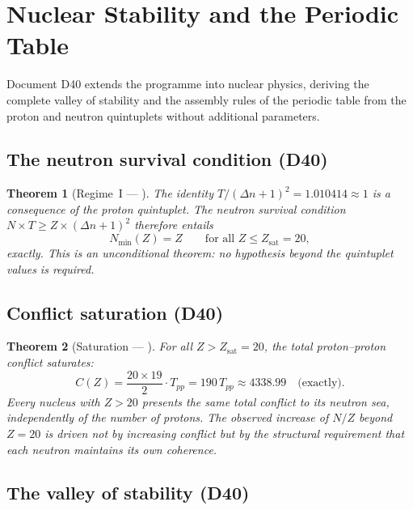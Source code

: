 \documentclass[11pt,a4paper]{article}
\theoremstyle{plain}
\newtheorem{theorem}{Theorem}[section]
\theoremstyle{definition}
\theoremstyle{remark}
\newcommand{\Tpp}{T_{pp}}
\newcommand{\Zsat}{Z_{\mathrm{sat}}}
\newcommand{\Nmin}{N_{\min}}
\begin{document}
\section{Nuclear Stability and the Periodic Table}
\label{sec:nuclear}

Document D40 extends the programme into nuclear physics, deriving the complete valley of stability and the assembly rules of the periodic table from the proton and neutron quintuplets without additional parameters.

\subsection{The neutron survival condition (D40)}
\label{subsec:neutron_survival}

\begin{theorem}[Regime~I — \citep{D40}]
\label{thm:NminI}
The identity $T/(\Delta n+1)^2 = 1.010414 \approx 1$ is a consequence of the proton quintuplet.
The neutron survival condition $N \times T \geq Z \times (\Delta n+1)^2$ therefore entails
\[
\Nmin(Z) = Z \qquad \text{for all } Z \leq \Zsat = 20,
\]
exactly.
This is an unconditional theorem: no hypothesis beyond the quintuplet values is required.
\end{theorem}

\subsection{Conflict saturation (D40)}
\label{subsec:conflict_sat}

\begin{theorem}[Saturation — \citep{D40}]
\label{thm:saturation}
For all $Z > \Zsat = 20$, the total proton--proton conflict saturates:
\[
C(Z) = \frac{20 \times 19}{2}\cdot\Tpp = 190\,\Tpp \approx 4338.99 \quad \text{(exactly)}.
\]
Every nucleus with $Z > 20$ presents the same total conflict to its neutron sea, independently of the number of protons.
The observed increase of $N/Z$ beyond $Z=20$ is driven not by increasing conflict but by the structural requirement that each neutron maintains its own coherence.
\end{theorem}

\subsection{The valley of stability (D40)}
\label{subsec:valley_stability}
\end{document}
